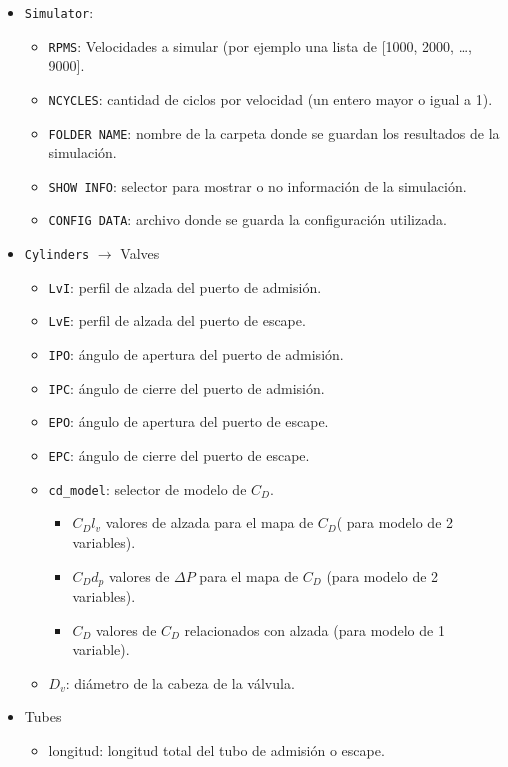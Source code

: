 \begin{itemize}
  \item {\tt Simulator}:
        \begin{itemize}
          \item {\tt RPMS}: Velocidades a simular (por ejemplo una lista de [1000,
2000, \ldots, 9000].
          \item {\tt NCYCLES}: cantidad de ciclos por velocidad (un entero mayor o igual a 1).
          \item {\tt FOLDER NAME}: nombre de la carpeta donde se guardan los
resultados de la simulación.
          \item {\tt SHOW INFO}: selector para mostrar o no información de la simulación.
          \item {\tt CONFIG DATA}: archivo donde se guarda la configuración utilizada.
        \end{itemize}
  \item {\tt Cylinders} $\longrightarrow$ Valves
        \begin{itemize}
          \item {\tt LvI}: perfil de alzada del puerto de admisión.
          \item {\tt LvE}: perfil de alzada del puerto de escape.
          \item {\tt IPO}: ángulo de apertura del puerto de admisión.
          \item {\tt IPC}: ángulo de cierre del puerto de admisión.
          \item {\tt EPO}: ángulo de apertura del puerto de escape.
          \item {\tt EPC}: ángulo de cierre del puerto de escape.
          \item {\tt cd\_model}: selector de modelo de $C_{D}$.
                \begin{itemize}
                  \item $C_{D}l_{v}$ valores de alzada para el mapa de $C_{D}$(
para modelo de 2 variables).
                  \item $C_{D}d_{p}$ valores de $\Delta P$ para el mapa de
$C_{D}$ (para modelo de 2 variables).
                  \item $C_{D}$ valores de $C_{D}$ relacionados con alzada (para modelo de 1 variable).
                \end{itemize}
          \item $D_{v}$: diámetro de la cabeza de la válvula.
        \end{itemize}
  \item Tubes
        \begin{itemize}
          \item longitud: longitud total del tubo de admisión o escape.
        \end{itemize}
\end{itemize}

